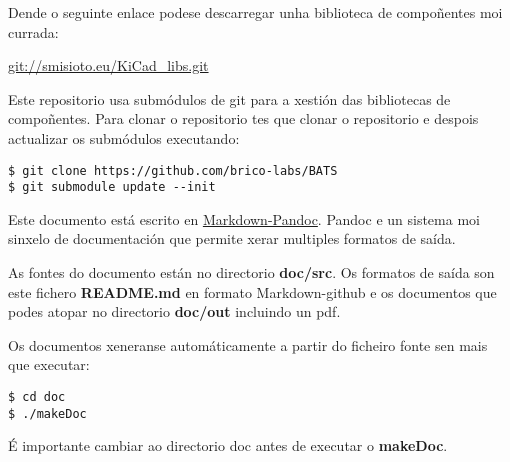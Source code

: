 Dende o seguinte enlace podese descarregar unha biblioteca de
compoñentes moi currada:

\url{git://smisioto.eu/KiCad_libs.git}


Este repositorio usa submódulos de git para a xestión das bibliotecas de
compoñentes. Para clonar o repositorio tes que clonar o repositorio e
despois actualizar os submódulos executando:

\begin{verbatim}
$ git clone https://github.com/brico-labs/BATS
$ git submodule update --init
\end{verbatim}

Este documento está escrito en
\href{http://pandoc.org/README.html}{Markdown-Pandoc}. Pandoc e un
sistema moi sinxelo de documentación que permite xerar multiples
formatos de saída.

As fontes do documento están no directorio \textbf{doc/src}. Os formatos
de saída son este fichero \textbf{README.md} en formato Markdown-github
e os documentos que podes atopar no directorio \textbf{doc/out}
incluindo un pdf.

Os documentos xeneranse automáticamente a partir do ficheiro fonte sen
mais que executar:

\begin{verbatim}
$ cd doc
$ ./makeDoc
\end{verbatim}

É importante cambiar ao directorio doc antes de executar o
\textbf{makeDoc}.
